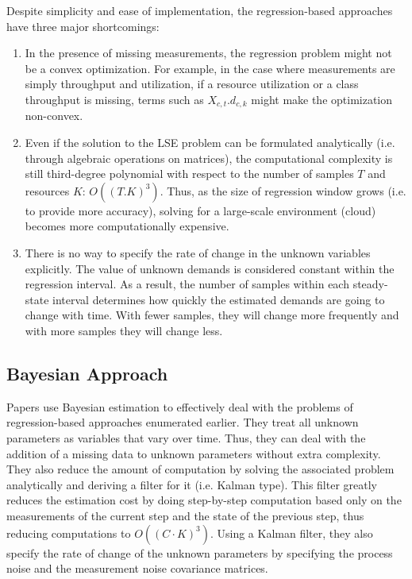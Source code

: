    Despite simplicity and ease of implementation, the regression-based approaches have three major shortcomings:
   \begin{enumerate}
   \item  In the presence of missing measurements, the regression problem might not be a convex optimization. For example, in the case where measurements are simply throughput and utilization, if a resource utilization or a class throughput is missing, terms such as $X_{c,t}.d_{c,k}$ might make the optimization non-convex.   
   \item  Even if the solution to the LSE problem can be formulated analytically (i.e. through algebraic operations on matrices), the computational complexity is still third-degree polynomial with respect to the number of samples $T$ and resources $K$: $O((T.K)^3)$. Thus, as the size of regression window grows (i.e. to provide more accuracy), solving for a large-scale environment (cloud) becomes more computationally expensive.  
   \item There is no way to specify the rate of change in the unknown variables explicitly. The value of unknown demands is considered constant within the regression interval. As a result, the number of samples within each steady-state interval determines how quickly the estimated demands are going to change with time. With fewer samples, they will change more frequently and with more samples they will change less. 
     \end{enumerate}

    \subsection{Bayesian Approach}   
		Papers \cite{woodside_use_2005,xu_performance_2005,zheng_tracking_2005} use Bayesian estimation to effectively deal with the problems of regression-based approaches enumerated earlier. They treat all unknown parameters as variables that vary over time. Thus, they can deal with the addition of a missing data to unknown parameters without extra complexity. They also reduce the amount of computation by solving the associated problem analytically and deriving a
        filter for it (i.e. Kalman type). This filter greatly reduces the estimation cost by doing step-by-step computation based only on the measurements of the current step and the state of the previous step, thus reducing computations to $O((C\cdot K)^3)$. Using a Kalman filter, they also specify the rate of change of the unknown parameters by specifying the process noise and the measurement noise covariance matrices. 

